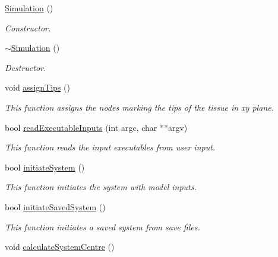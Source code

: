 \begin{DoxyCompactItemize}
\item 
\hypertarget{classSimulation_a5b224cc5b36bcc8eb29689aff223de41}{}\hyperlink{classSimulation_a5b224cc5b36bcc8eb29689aff223de41}{Simulation} ()\label{classSimulation_a5b224cc5b36bcc8eb29689aff223de41}

\begin{DoxyCompactList}\small\item\em Constructor. \end{DoxyCompactList}\item 
\hypertarget{classSimulation_a80fad3f57dfaf195a36f7bc49bc88279}{}\hyperlink{classSimulation_a80fad3f57dfaf195a36f7bc49bc88279}{$\sim$\+Simulation} ()\label{classSimulation_a80fad3f57dfaf195a36f7bc49bc88279}

\begin{DoxyCompactList}\small\item\em Destructor. \end{DoxyCompactList}\item 
\hypertarget{classSimulation_a7ed75e3d044166072754e6e323f3604c}{}void \hyperlink{classSimulation_a7ed75e3d044166072754e6e323f3604c}{assign\+Tips} ()\label{classSimulation_a7ed75e3d044166072754e6e323f3604c}

\begin{DoxyCompactList}\small\item\em This function assigns the nodes marking the tips of the tissue in xy plane. \end{DoxyCompactList}\item 
bool \hyperlink{classSimulation_aa5c031b9d4c6b3d74f636adec0b695ed}{read\+Executable\+Inputs} (int argc, char $\ast$$\ast$argv)
\begin{DoxyCompactList}\small\item\em This function reads the input executables from user input. \end{DoxyCompactList}\item 
bool \hyperlink{classSimulation_ae44910ca27d6ec5eaa48f7136fad87ea}{initiate\+System} ()
\begin{DoxyCompactList}\small\item\em This function initiates the system with model inputs. \end{DoxyCompactList}\item 
bool \hyperlink{classSimulation_a6ef90fd76ed4f6bb9d063e7e72e9a983}{initiate\+Saved\+System} ()
\begin{DoxyCompactList}\small\item\em This function initiates a saved system from save files. \end{DoxyCompactList}\item 
\hypertarget{classSimulation_a1f9bf054812136067d30e79345f877de}{}void \hyperlink{classSimulation_a1f9bf054812136067d30e79345f877de}{calculate\+System\+Centre} ()\label{classSimulation_a1f9bf054812136067d30e79345f877de}


\end{DoxyCompactItemize}
